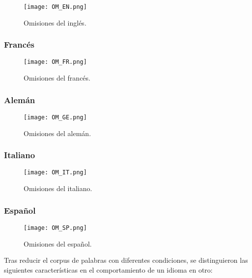 \begin{figure}[h!]
	\centering
	\texttt{[image: OM\_EN.png]}
	\label{fig.OM_EN}
	\caption{Omisiones del inglés.}
\end{figure}


\subsubsection*{Francés}

\begin{figure}[h!]
	\centering
	\texttt{[image: OM\_FR.png]}
	\label{fig.OM_FR}
	\caption{Omisiones del francés.}
\end{figure}


\newpage
\subsubsection*{Alemán}

\begin{figure}[h!]
	\centering
	\texttt{[image: OM\_GE.png]}
	\label{fig.OM_GE}
	\caption{Omisiones del alemán.}
\end{figure}


\subsubsection*{Italiano}

\begin{figure}[h!]
	\centering
	\texttt{[image: OM\_IT.png]}
	\label{fig.OM_IT}
	\caption{Omisiones del italiano.}
\end{figure}

\newpage
\subsubsection*{Español}

\begin{figure}[h!]
	\centering
	\texttt{[image: OM\_SP.png]}
	\label{fig.OM_SP}
	\caption{Omisiones del español.}
\end{figure}


Tras reducir el corpus de palabras con diferentes condiciones, se distinguieron las siguientes características en el comportamiento de un idioma en otro:


